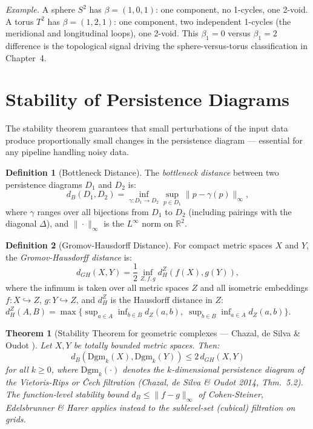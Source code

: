 \documentclass[12pt, a4paper]{report}
\newcommand{\Dgm}{\mathrm{Dgm}}
\newcommand{\Betti}{\beta}
\newcommand{\R}{\mathbb{R}}
\theoremstyle{definition}
\newtheorem{definition}{Definition}[chapter]
\theoremstyle{plain}
\newtheorem{theorem}{Theorem}[chapter]
\theoremstyle{remark}
\begin{document}
\textit{Example.} A sphere $S^2$ has $\Betti = (1, 0, 1)$: one
component, no 1-cycles, one 2-void. A torus $T^2$ has
$\Betti = (1, 2, 1)$: one component, two independent 1-cycles
(the meridional and longitudinal loops), one 2-void. This
$\Betti_1 = 0$ versus $\Betti_1 = 2$ difference is the topological
signal driving the sphere-versus-torus classification in Chapter~4.

\section{Stability of Persistence Diagrams}
\label{sec:stability}

The stability theorem guarantees that small perturbations of the
input data produce proportionally small changes in the persistence
diagram --- essential for any pipeline handling noisy data.

\begin{definition}[Bottleneck Distance]
  The \emph{bottleneck distance} between two persistence diagrams
  $D_1$ and $D_2$ is:
  \begin{equation}
    d_B(D_1, D_2) = \inf_{\gamma: D_1 \to D_2}
    \sup_{p \in D_1} \|p - \gamma(p)\|_\infty,
    \label{eq:bottleneck}
  \end{equation}
  where $\gamma$ ranges over all bijections from $D_1$ to $D_2$
  (including pairings with the diagonal $\Delta$), and
  $\|\cdot\|_\infty$ is the $L^\infty$ norm on $\R^2$.
\end{definition}

\begin{definition}[Gromov-Hausdorff Distance]
  For compact metric spaces $X$ and $Y$, the \emph{Gromov-Hausdorff
  distance} is:
  \begin{equation}
    d_{GH}(X, Y) = \frac{1}{2} \inf_{Z, f, g}
    d_H^Z(f(X), g(Y)),
    \label{eq:gh}
  \end{equation}
  where the infimum is taken over all metric spaces $Z$ and all
  isometric embeddings $f: X \hookrightarrow Z$, $g: Y
  \hookrightarrow Z$, and $d_H^Z$ is the Hausdorff distance in $Z$:
  $d_H^Z(A, B) = \max\{\sup_{a \in A} \inf_{b \in B} d_Z(a,b),\;
  \sup_{b \in B} \inf_{a \in A} d_Z(a,b)\}$.
\end{definition}

\begin{theorem}[Stability Theorem for geometric complexes --- Chazal, de Silva \& Oudot \cite{chazalDesilvaOudot2014}]
  \label{thm:stability}
  Let $X, Y$ be totally bounded metric spaces. Then:
  \begin{equation}
    d_B(\Dgm_k(X), \Dgm_k(Y)) \leq 2 \, d_{GH}(X, Y)
    \label{eq:stability}
  \end{equation}
  for all $k \ge 0$, where $\Dgm_k(\cdot)$ denotes the $k$-dimensional
  persistence diagram of the Vietoris-Rips or \v{C}ech filtration
  (Chazal, de Silva \& Oudot 2014, Thm.~5.2). The function-level
  stability bound $d_B \le \|f-g\|_\infty$ of Cohen-Steiner,
  Edelsbrunner \& Harer \cite{cohen2007} applies instead to the
  sublevel-set (cubical) filtration on grids.
\end{theorem}
\end{document}
